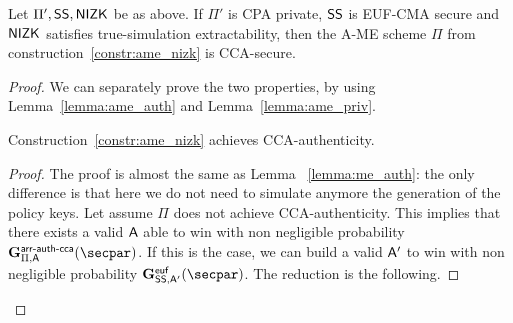 \begin{theorem}\label{theo:ame_nizk}
    Let $\Pi', \mathsf{SS}, \mathsf{NIZK}$ be as above. If $\Pi'$ is CPA private, $\mathsf{SS}$ is EUF-CMA secure and $\mathsf{NIZK}$ satisfies true-simulation extractability, then the A-ME scheme $\Pi$ from construction~\ref{constr:ame_nizk} is CCA-secure.

    \begin{proof}
        We can separately prove the two properties, by using Lemma~\ref{lemma:ame_auth} and Lemma~\ref{lemma:ame_priv}.

        \begin{lemma}\label{lemma:ame_auth}
            Construction~\ref{constr:ame_nizk} achieves CCA-authenticity.
            \begin{proof}
                The proof is almost the same as Lemma ~\ref{lemma:me_auth}: the only difference is that here we do not need to simulate anymore the generation of the policy keys.
                Let assume $\Pi$ does not achieve CCA-authenticity. This implies that there exists a valid $\mathsf{A}$ able to win with non negligible probability $\NISHeufgamecca{\arranged}_{\Pi, \adversary}(\secpar)$. If this is the case, we can build a valid $\mathsf{A}'$ to win with non negligible probability $\Sigeufgame_{\sig, \adversary'}(\secpar)$. The reduction is the following.


\end{proof}
\end{lemma}
\end{proof}
\end{theorem}
